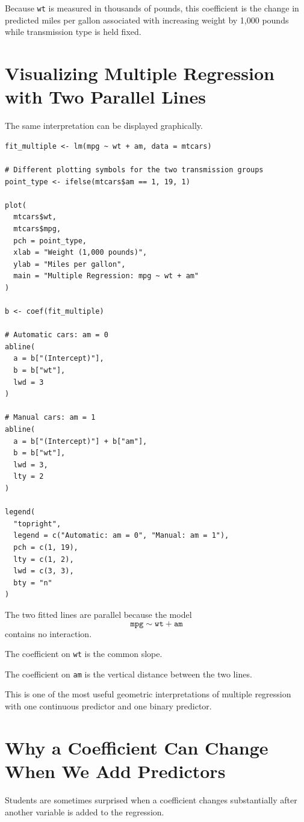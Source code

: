 \documentclass[11pt]{report}
\begin{document}
Because \texttt{wt} is measured in thousands of pounds, this coefficient is the change in predicted miles per gallon associated with increasing weight by 1,000 pounds while transmission type is held fixed.

\section{Visualizing Multiple Regression with Two Parallel Lines}

The same interpretation can be displayed graphically.

\begin{lstlisting}
fit_multiple <- lm(mpg ~ wt + am, data = mtcars)

# Different plotting symbols for the two transmission groups
point_type <- ifelse(mtcars$am == 1, 19, 1)

plot(
  mtcars$wt,
  mtcars$mpg,
  pch = point_type,
  xlab = "Weight (1,000 pounds)",
  ylab = "Miles per gallon",
  main = "Multiple Regression: mpg ~ wt + am"
)

b <- coef(fit_multiple)

# Automatic cars: am = 0
abline(
  a = b["(Intercept)"],
  b = b["wt"],
  lwd = 3
)

# Manual cars: am = 1
abline(
  a = b["(Intercept)"] + b["am"],
  b = b["wt"],
  lwd = 3,
  lty = 2
)

legend(
  "topright",
  legend = c("Automatic: am = 0", "Manual: am = 1"),
  pch = c(1, 19),
  lty = c(1, 2),
  lwd = c(3, 3),
  bty = "n"
)
\end{lstlisting}

The two fitted lines are parallel because the model
\[
\texttt{mpg} \sim \texttt{wt}+\texttt{am}
\]
contains no interaction.

The coefficient on \texttt{wt} is the common slope.

The coefficient on \texttt{am} is the vertical distance between the two lines.

This is one of the most useful geometric interpretations of multiple regression with one continuous predictor and one binary predictor.

\section{Why a Coefficient Can Change When We Add Predictors}

Students are sometimes surprised when a coefficient changes substantially after another variable is added to the regression.
\end{document}
